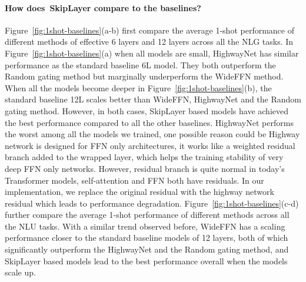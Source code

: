 \documentclass{article}
\newcommand{\skipl}{SkipLayer\xspace}
\begin{document}
\paragraph{How does~\skipl compare to the baselines?} Figure~\ref{fig:1shot-baselines}(a-b) first compare the average 1-shot performance of different methods of effective 6 layers and 12 layers across all the NLG tasks. In Figure~\ref{fig:1shot-baselines}(a) when all models are small, HighwayNet has similar performance as the standard baseline 6L model. They both outperform the Random gating method but marginally underperform the WideFFN method. When all the models become deeper in Figure~\ref{fig:1shot-baselines}(b), the standard baseline 12L scales better than WideFFN, HighwayNet and the Random gating method. However, in both cases, SkipLayer based models have achieved the best performance compared to all the other baselines. HighwayNet performs the worst among all the models we trained, one possible reason could be Highway network is designed for FFN only architectures, it works like a weighted residual branch added to the wrapped layer, which helps the training stability of very deep FFN only networks. However, residual branch is quite normal in today's Transformer models, self-attention and FFN both have residuals. In our implementation, we replace the original residual with the highway network residual which leads to performance degradation.
%
Figure~\ref{fig:1shot-baselines}(c-d) further compare the average 1-shot performance of different methods across all the NLU tasks. With a similar trend observed before, WideFFN has a scaling performance closer to the standard baseline models of 12 layers, both of which significantly outperform the HighwayNet and the Random gating method, and SkipLayer based models lead to the best performance overall when the models scale up. 
\end{document}
